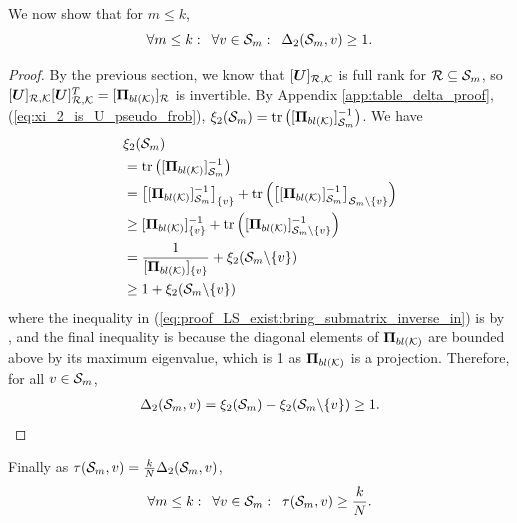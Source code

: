 We now show that for $m \leq k$, 
\begin{equation}
    \forall m \leq k: \enskip \forall v \in \mathcal{S}_{m}: \enskip \Delta_{2}(\mathcal{S}_{m},v) \geq 1.
\end{equation}
\begin{proof}
By the previous section, we know that $\matrsubU{R}$ is full rank for $\mathcal{R}\subseteq \mathcal{S}_{m}$, so $\matrsubU{R}\matrsubU{R}^{T} = \projbl[R]$ is invertible. By Appendix \ref{app:table_delta_proof}, (\ref{eq:xi_2_is_U_pseudo_frob}), $\xi_{2}(\set{S}_{m}) = \trace{\projblgen[\set{S}_{m}]^{-1}}$. We have
\begin{align}
    &\xi_{2}(\set{S}_{m}) \\
    &= \trace{\projblgen[\set{S}_{m}]^{-1}} \\
    &= \msubgen[\{v\}]{\projblgen[\set{S}_{m}]^{-1}} + \trace{\msubgen[\set{S}_{m} \backslash \{v\}]{\projblgen[\set{S}_{m}]^{-1}}} \\
    &\geq \projblgen[\{v\}]^{-1} + \trace{\projblgen[\set{S}_{m} \backslash \{v\}]^{-1}} \label{eq:proof_LS_exist:bring_submatrix_inverse_in} \\
    &= \frac{1}{\projblgen[\{v\}]} + \xi_{2}(\set{S}_{m} \backslash \{v\}) \\
    &\geq 1 + \xi_{2}(\set{S}_{m} \backslash \{v\})
\end{align}
where the inequality in (\ref{eq:proof_LS_exist:bring_submatrix_inverse_in}) is by \cite[Eq. 5]{zhang2000schur}, and the final inequality is because the diagonal elements of $\projbl$ are bounded above by its maximum eigenvalue, which is 1 as $\projbl$ is a projection. Therefore, for all $v \in \mathcal{S}_{m}$,
\begin{align}
    \Delta_{2}(\mathcal{S}_{m},v) = \xi_{2}(\mathcal{S}_{m}) - \xi_{2}(\mathcal{S}_{m} \backslash \{v\}) \geq 1.
\end{align}

\end{proof}
Finally as $\tau(\mathcal{S}_{m},v) = \frac{k}{N}\Delta_{2}(\mathcal{S}_{m},v)$,
\begin{equation}
     \forall m \leq k: \enskip \forall v \in \mathcal{S}_{m}: \enskip \tau(\mathcal{S}_{m},v) \geq \frac{k}{N}. 
\end{equation}
